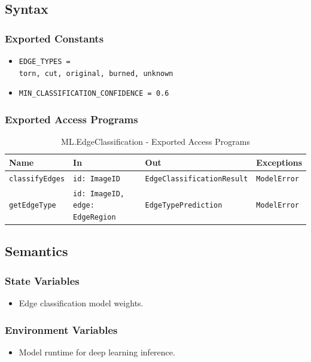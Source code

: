 \documentclass[12pt, titlepage]{article}
\begin{document}
\subsection{Syntax}

\subsubsection{Exported Constants}
\begin{itemize}
    \item \texttt{EDGE\_TYPES = \\{torn, cut, original, burned, unknown\\}}
    \item \texttt{MIN\_CLASSIFICATION\_CONFIDENCE = 0.6}
\end{itemize}

\subsubsection{Exported Access Programs}

\begin{table}[H]
\centering
\small
\caption{ML.EdgeClassification - Exported Access Programs}
\begin{tabular}{p{3.5cm} p{3.5cm} p{3.5cm} p{3.5cm}}
\toprule
\textbf{Name} & \textbf{In} & \textbf{Out} & \textbf{Exceptions} \\
\midrule
\texttt{classifyEdges} & \texttt{id: ImageID} & \texttt{EdgeClassificationResult} & \texttt{ModelError} \\
\texttt{getEdgeType} & \texttt{id: ImageID, edge: EdgeRegion} & \texttt{EdgeTypePrediction} & \texttt{ModelError} \\
\bottomrule
\end{tabular}
\end{table}

\subsection{Semantics}

\subsubsection{State Variables}
\begin{itemize}
    \item Edge classification model weights.
\end{itemize}

\subsubsection{Environment Variables}
\begin{itemize}
    \item Model runtime for deep learning inference.
\end{itemize}
\end{document}
